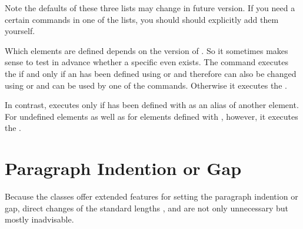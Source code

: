 Note the defaults of these three lists may change in future version. If you
need a certain commands in one of the lists, you should should explicitly add
them yourself.%
\EndIndexGroup


\begin{Declaration}
\end{Declaration}
Which elements are defined depends on the
version of \KOMAScript. So it sometimes makes sense to test in advance whether
a specific  even exists. The  command
executes the  if and only if an  has been
defined using  or
 and therefore can also be changed using
 or  and
can be used by one of the  commands. Otherwise it
executes the .%

In contrast,  executes
 only if  has been defined with
 as an alias of another element. For
undefined elements as well as for elements defined with
, however, it executes the
.%
\EndIndexGroup

\section{Paragraph Indention or Gap}

Because the \KOMAScript{} classes offer extended features for setting the
paragraph indention or gap, direct changes of the standard lengths
, 
and  are not only unnecessary but
mostly inadvisable.

